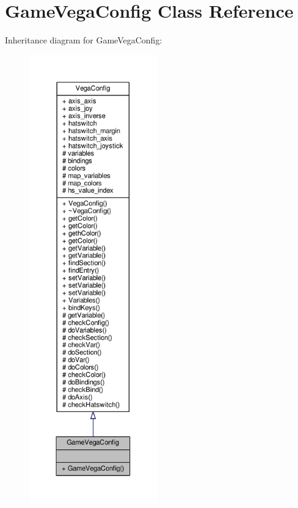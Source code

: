 \hypertarget{classGameVegaConfig}{}\section{Game\+Vega\+Config Class Reference}
\label{classGameVegaConfig}


Inheritance diagram for Game\+Vega\+Config\+:
\nopagebreak
\begin{figure}[H]
\begin{center}
\leavevmode
\includegraphics[height=550pt]{df/d2c/classGameVegaConfig__inherit__graph}
\end{center}
\end{figure}



